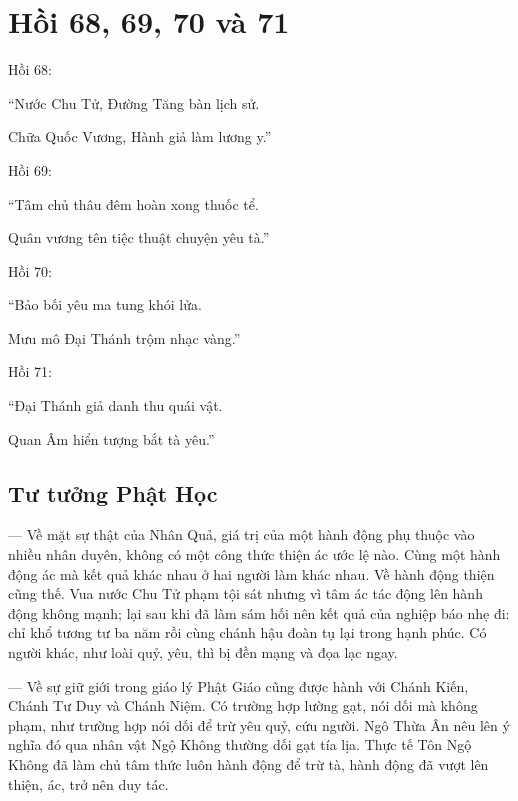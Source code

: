 \chapter{Hồi 68, 69, 70 và 71} %
\label{cha:hoi_68_69}

Hồi 68:

\begin{itshape}
``Nước Chu Tử, Đường Tăng bàn lịch sử.

Chữa Quốc Vương, Hành giả làm lương y.''
\end{itshape}

Hồi 69:

\begin{itshape}
``Tâm chủ thâu đêm hoàn xong thuốc tể.

Quân vương tên tiệc thuật chuyện yêu tà.''
\end{itshape}

Hồi 70:

\begin{itshape}
``Bảo bối yêu ma tung khói lửa.

Mưu mô Đại Thánh trộm nhạc vàng.''
\end{itshape}

Hồi 71:

\begin{itshape}
``Đại Thánh giả danh thu quái vật.

Quan Âm hiển tượng bắt tà yêu.''
\end{itshape}

\section{Tư tưởng Phật Học} %
\label{sec:68_69_phat_hoc}

--- Về mặt sự thật của Nhân Quả, giá trị của một hành động phụ thuộc vào nhiều nhân duyên, không có một công thức thiện ác ước lệ nào. Cùng một hành động ác mà kết quả khác nhau ở hai người làm khác nhau. Về hành động thiện cũng thế. Vua nước Chu Tử phạm tội sát nhưng vì tâm ác tác động lên hành động không mạnh; lại sau khi đã làm sám hối nên kết quả của nghiệp báo nhẹ đi: chỉ khổ tương tư ba năm rồi cùng chánh hậu đoàn tụ lại trong hạnh phúc. Có người khác, như loài quỷ, yêu, thì bị đền mạng và đọa lạc ngay.

--- Về sự giữ giới trong giáo lý Phật Giáo cũng được hành với Chánh Kiến, Chánh Tư Duy và Chánh Niệm. Có trường hợp lường gạt, nói dối mà không phạm, như trường hợp nói dối để trừ yêu quỷ, cứu người. Ngô Thừa Ân nêu lên ý nghĩa đó qua nhân vật Ngộ Không thường dối gạt tía lịa. Thực tế Tôn Ngộ Không đã làm chủ tâm thức luôn hành động để trừ tà, hành động đã vượt lên thiện, ác, trở nên duy tác.

